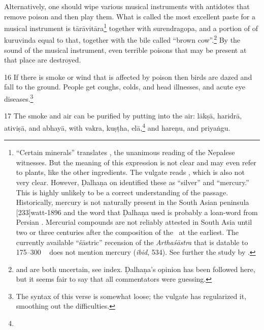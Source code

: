 \begin{translation}
Alternatively, one should wipe  various musical instruments with
antidotes that remove poison and then play  them. What is called the
most  excellent paste for a musical instrument is
\gls{tārāvitāra}\footnote{“Certain  minerals” translates
    , the unanimous  reading of the Nepalese  witnesses.
    But the meaning of this expression is not  clear and may even refer to
    plants, like the other ingredients.  The vulgate  reads ,  which is also not very clear.  However, Ḍalhaṇa on
     identified  these as “silver” and “mercury.” This is
    highly unlikely  to be a correct understanding of  the passage.
    Historically, mercury is not  naturally present in the South  Asian
    peninsula [233]{watt-1896}  and the word  that
    Ḍalhaṇa used is probably a loan-word from  Persian \citep[sub
    \emph{paranda, parranda}][244b]{stei-pers}. Mercurial compounds are
    not  reliably attested in South Asia until two or three  centuries
    after the composition  of the \SS\ at the earliest.  The currently
    available  “śāstric” recension of the  \emph{Arthaśāstra} that is
    datable to 175--300 \CE\  \citep[29--31]{oliv-2013} does  not mention
    mercury (\emph{ibid}, 534). See further the study by  \citet[17,
    \emph{et passim}]{wuja-2013b}.}  together with  \gls{surendragopa},
    and a  portion of of \gls{kuruvinda} equal to that,  together with the
    bile called  “brown cow”.\footnote{  and
         are both  uncertain, see index. Ḍalhaṇa's opinion has
        been followed here, but it  seems fair to say that all commentators
        were  guessing.} By the sound of  the musical instrument, even
        terrible poisons that may be present  at that place are destroyed.

\item
[16]  If there is smoke or wind that  is affected by poison then  birds are dazed 
and fall to the ground.  People get  coughs, colds, and head  illnesses, and acute 
eye diseases.\footnote{The syntax  of this verse is somewhat  loose; the vulgate 
has regularized it, smoothing  out the difficulties.}  

\item
[17]  The smoke and air can be  purified by putting into the  air:  \gls{lākṣā}, 
\gls{haridrā}, \gls{ativiṣā}, and \gls{abhayā}, with \gls{vakra}, \gls{kuṣṭha}, 
\gls{elā},\footnote{} and \gls{hareṇu}, and \gls{priyaṅgu}.  \end{translation}  
